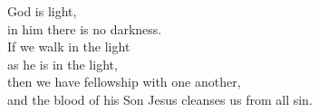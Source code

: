 
\lettrine{G}{}od is light,\\
in him there is no darkness.\\
If we walk in the light\\
as he is in the light,\\
then we have fellowship with one another,\\
and the blood of his Son Jesus cleanses us from all sin.